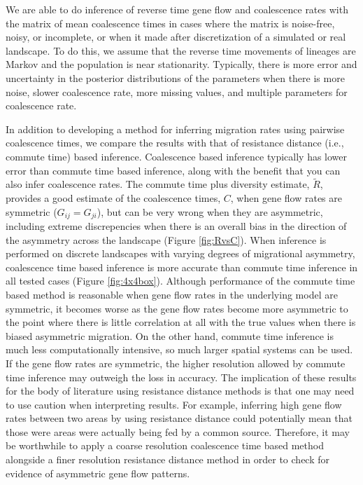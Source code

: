 \documentclass{article}
\newcommand{\comdist}{\widetilde{R}}
\begin{document}
We are able to do inference of reverse time gene flow and coalescence rates 
with the matrix of mean coalescence times
in cases where the matrix is noise-free, noisy, or incomplete, 
or when it made after discretization of a simulated or real landscape.
To do this, we assume that the reverse time movements of lineages are Markov
and the population is near stationarity.
Typically, there is more error and uncertainty in the posterior distributions of the parameters
when there is more noise, slower coalescence rate, more missing values,
and multiple parameters for coalescence rate.

In addition to developing a method for inferring migration rates using pairwise coalescence times,
we compare the results with that of resistance distance (i.e., commute time) based inference.
Coalescence based inference typically has lower error than commute time based inference,
along with the benefit that you can also infer coalescence rates. 
The commute time plus diversity estimate, $\comdist$, 
provides a good estimate of the coalescence times, $C$,
when gene flow rates are symmetric ($G_{ij} = G_{ji}$), 
but can be very wrong when they are asymmetric, 
including extreme discrepencies 
when there is an overall bias in the direction of the asymmetry across the landscape 
(Figure \ref{fig:RvsC}).
When inference is performed on discrete landscapes 
with varying degrees of migrational asymmetry, 
coalescence time based inference is more accurate than commute time inference in all tested cases
(Figure \ref{fig:4x4box}).
Although performance of the commute time based method is reasonable 
when gene flow rates in the underlying model are symmetric, 
it becomes worse as the gene flow rates become more asymmetric 
to the point where there is little correlation at all with the true values 
when there is biased asymmetric migration.
On the other hand, commute time inference is much less computationally intensive, 
so much larger spatial systems can be used.
If the gene flow rates are symmetric, the higher resolution allowed by commute time inference
may outweigh the loss in accuracy.
The implication of these results for the body of literature using resistance distance methods
is that one may need to use caution when interpreting results.
For example, inferring high gene flow rates between two areas by using resistance distance
could potentially mean that those were areas were actually being fed by a common source.
Therefore, it may be worthwhile to apply a coarse resolution coalescence time based method 
alongside a finer resolution resistance distance method 
in order to check for evidence of asymmetric gene flow patterns.
\end{document}
